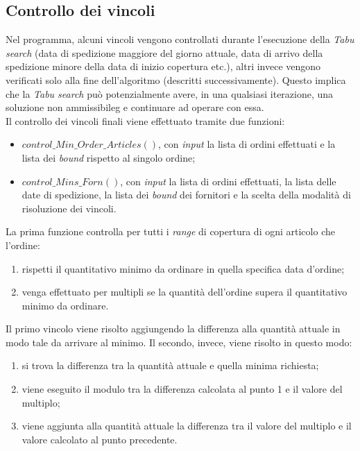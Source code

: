 \subsection{Controllo dei vincoli}
\label{sec:controllo-vincoli}
\noindent Nel programma, alcuni vincoli vengono controllati durante l'esecuzione
della \textit{Tabu search} (data di spedizione maggiore del giorno attuale,
data di arrivo della spedizione minore della data di inizio copertura etc.), altri invece vengono verificati solo alla fine dell'algoritmo (descritti successivamente).
Questo implica che la \textit{Tabu search} può potenzialmente avere, in
una qualsiasi iterazione, una soluzione non \gls{ammissibileg} e
continuare ad operare con essa.\\
Il controllo dei vincoli finali viene effettuato tramite due funzioni:
\begin{itemize}
    \item $control\_Min\_Order\_Articles()$, con \textit{input} la
    lista di ordini effettuati e la lista dei \textit{bound} rispetto
    al singolo ordine;
    \item $control\_Mins\_Forn()$, con \textit{input} la lista di
    ordini effettuati, la lista delle date di spedizione,
    la lista dei \textit{bound} dei fornitori e la scelta della
    modalità di risoluzione dei vincoli.
\end{itemize}
\noindent La prima funzione controlla per tutti i \textit{range} di
copertura di ogni articolo che l'ordine:
\begin{enumerate}
    \item rispetti il quantitativo minimo
    da ordinare in quella specifica data d'ordine;
    \item venga effettuato per multipli se la quantità
    dell'ordine supera il quantitativo minimo da ordinare.
\end{enumerate}
Il primo vincolo viene risolto aggiungendo la differenza alla quantità attuale
in modo tale da arrivare al minimo.
Il secondo, invece, viene risolto in questo modo:
\begin{enumerate}
    \item si trova la differenza tra la quantità attuale
    e quella minima richiesta;
    \item viene eseguito il modulo tra la differenza calcolata al punto 1 e il valore del multiplo;
    \item viene aggiunta alla quantità attuale la differenza tra il valore del multiplo e il valore calcolato al punto precedente.
\end{enumerate}
